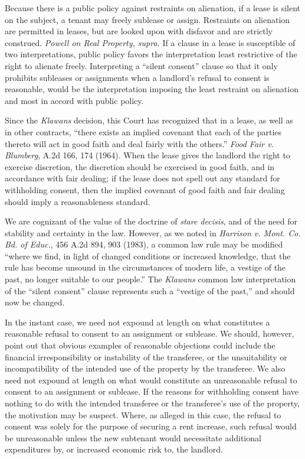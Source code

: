 Because there is a public policy against restraints on alienation, if a lease is
silent on the subject, a tenant may freely sublease or assign. Restraints on
alienation are permitted in leases, but are looked upon with disfavor and are
strictly construed. \textit{Powell on Real Property, supra.} If a clause in a
lease is susceptible of two interpretations, public policy favors the
interpretation least restrictive of the right to alienate freely. Interpreting
a ``silent consent'' clause so that it only prohibits subleases or assignments
when a landlord's refusal to consent is reasonable, would be the interpretation
imposing the least restraint on alienation and most in accord with public
policy.

Since the \textit{Klawans} decision, this Court has recognized that in a lease,
as well as in other contracts, ``there exists an implied covenant that each of
the parties thereto will act in good faith and deal fairly with the others.''
\textit{Food Fair v. Blumberg}, A.2d 166, 174 (1964). When the lease gives the
landlord the right to exercise discretion, the discretion should be exercised
in good faith, and in accordance with fair dealing; if the lease does not spell
out any standard for withholding consent, then the implied covenant of good
faith and fair dealing should imply a reasonableness standard.

We are cognizant of the value of the doctrine of \textit{stare decisis}, and of
the need for stability and certainty in the law. However, as we noted in
\textit{Harrison v. Mont. Co. Bd. of Educ.}, 456 A.2d 894, 903 (1983), a common
law rule may be modified ``where we find, in light of changed conditions or
increased knowledge, that the rule has become unsound in the circumstances of
modern life, a vestige of the past, no longer suitable to our people.'' The
\textit{Klawans} common law interpretation of the ``silent consent'' clause
represents such a ``vestige of the past,'' and should now be changed. 


In the instant case, we need not expound at length on what constitutes a
reasonable refusal to consent to an assignment or sublease. We should, however,
point out that obvious examples of reasonable objections could include the
financial irresponsibility or instability of the transferee, or the
unsuitability or incompatibility of the intended use of the property by the
transferee. We also need not expound at length on what would constitute an
unreasonable refusal to consent to an assignment or sublease. If the reasons
for withholding consent have nothing to do with the intended transferee or the
transferee's use of the property, the motivation may be suspect. Where, as
alleged in this case, the refusal to consent was solely for the purpose of
securing a rent increase, such refusal would be unreasonable unless the new
subtenant would necessitate additional expenditures by, or increased economic
risk to, the landlord. 

